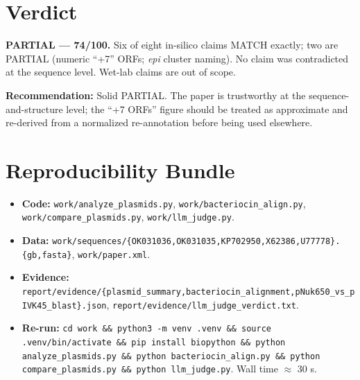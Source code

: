 \documentclass[11pt,letterpaper]{article}
\begin{document}
\section{Verdict}

\textbf{PARTIAL --- 74/100.} Six of eight in-silico claims MATCH exactly; two are PARTIAL (numeric ``+7'' ORFs; \textit{epi} cluster naming). No claim was contradicted at the sequence level. Wet-lab claims are out of scope.

\textbf{Recommendation:} Solid PARTIAL. The paper is trustworthy at the sequence-and-structure level; the ``+7 ORFs'' figure should be treated as approximate and re-derived from a normalized re-annotation before being used elsewhere.

\section{Reproducibility Bundle}

\begin{itemize}
  \item \textbf{Code:} \texttt{work/analyze\_plasmids.py}, \texttt{work/bacteriocin\_align.py}, \texttt{work/compare\_plasmids.py}, \texttt{work/llm\_judge.py}.
  \item \textbf{Data:} \texttt{work/sequences/\{OK031036,OK031035,KP702950,X62386,U77778\}.\{gb,fasta\}}, \texttt{work/paper.xml}.
  \item \textbf{Evidence:} \texttt{report/evidence/\{plasmid\_summary,bacteriocin\_alignment,pNuk650\_vs\_pIVK45\_blast\}.json}, \texttt{report/evidence/llm\_judge\_verdict.txt}.
  \item \textbf{Re-run:} \texttt{cd work \&\& python3 -m venv .venv \&\& source .venv/bin/activate \&\& pip install biopython \&\& python analyze\_plasmids.py \&\& python bacteriocin\_align.py \&\& python compare\_plasmids.py \&\& python llm\_judge.py}. Wall time $\approx$ 30 s.
\end{itemize}
\end{document}
